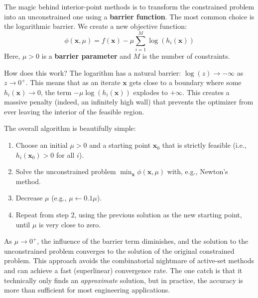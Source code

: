 The magic behind interior-point methods is to transform the constrained problem into an unconstrained one using a \textbf{barrier function}. The most common choice is the logarithmic barrier. We create a new objective function:
\begin{equation}
\phi(\mathbf{x}, \mu) = f(\mathbf{x}) - \mu \sum_{i=1}^{M} \log(h_i(\mathbf{x}))
\end{equation}
Here, $\mu > 0$ is a \textbf{barrier parameter} and $M$ is the number of constraints.

How does this work? The logarithm has a natural barrier: $\log(z) \to -\infty$ as $z \to 0^+$. This means that as an iterate $\mathbf{x}$ gets close to a boundary where some $h_i(\mathbf{x}) \to 0$, the term $-\mu \log(h_i(\mathbf{x}))$ explodes to $+\infty$. This creates a massive penalty (indeed, an infinitely high wall) that prevents the optimizer from ever leaving the interior of the feasible region.

The overall algorithm is beautifully simple:
\begin{enumerate}
    \item Choose an initial $\mu > 0$ and a starting point $\mathbf{x}_0$ that is strictly feasible (i.e., $h_i(\mathbf{x}_0) > 0$ for all $i$).
    \item Solve the unconstrained problem $\min_{\mathbf{x}} \phi(\mathbf{x}, \mu)$ with, e.g., Newton's method.
    \item Decrease $\mu$ (e.g., $\mu \leftarrow 0.1 \mu$).
    \item Repeat from step 2, using the previous solution as the new starting point, until $\mu$ is very close to zero.
\end{enumerate}

As $\mu \to 0^+$, the influence of the barrier term diminishes, and the solution to the unconstrained problem converges to the solution of the original constrained problem. This approach avoids the combinatorial nightmare of active-set methods and can achieve a fast (superlinear) convergence rate. The one catch is that it technically only finds an \emph{approximate} solution, but in practice, the accuracy is more than sufficient for most engineering applications.


